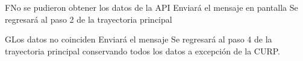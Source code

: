 		\begin{UCtrayectoriaA}{F}{No se pudieron obtener los datos de la API}
			\UCpaso[\UCsist] Enviará el mensaje en pantalla  
			\UCpaso[\UCsist] Se regresará al paso 2 de la trayectoria principal
		\end{UCtrayectoriaA}		
		
		
		
		\begin{UCtrayectoriaA}{G}{Los datos no coinciden}
			\UCpaso[\UCsist] Enviará el mensaje  
			\UCpaso[\UCsist] Se regresará al paso 4 de la trayectoria principal conservando todos los datos a excepción de la CURP.

		\end{UCtrayectoriaA}
		
		
		
		
		
		
